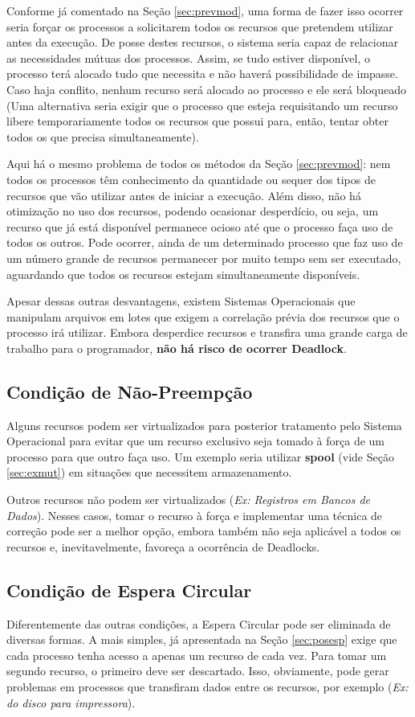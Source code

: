 	Conforme já comentado na Seção \ref{sec:prevmod}, uma forma de fazer isso ocorrer seria forçar os processos a solicitarem todos os recursos que pretendem utilizar antes da execução. De posse destes recursos, o sistema seria capaz de relacionar as necessidades mútuas dos processos. Assim, se tudo estiver disponível, o processo terá alocado tudo que necessita e não haverá possibilidade de impasse. Caso haja conflito, nenhum recurso será alocado ao processo e ele será bloqueado (Uma alternativa seria exigir que o processo que esteja requisitando um recurso libere temporariamente todos os recursos que possui para, então, tentar obter todos os que precisa simultaneamente).

	Aqui há o mesmo problema de todos os métodos da Seção \ref{sec:prevmod}: nem todos os processos têm conhecimento da quantidade ou sequer dos tipos de recursos que vão utilizar antes de iniciar a execução. Além disso, não há otimização no uso dos recursos, podendo ocasionar desperdício, ou seja, um recurso que já está disponível permanece ocioso até que o processo faça uso de todos os outros. Pode ocorrer, ainda de um determinado processo que faz uso de um número grande de recursos permanecer por muito tempo sem ser executado, aguardando que todos os recursos estejam simultaneamente disponíveis.

	Apesar dessas outras desvantagens, existem Sistemas Operacionais que manipulam arquivos em lotes que exigem a correlação prévia dos recursos que o processo irá utilizar. Embora desperdice recursos e transfira uma grande carga de trabalho para o programador, \textbf{não há risco de ocorrer Deadlock}.

	\subsection{Condição de Não-Preempção}
	Alguns recursos podem ser virtualizados para posterior tratamento pelo Sistema Operacional para evitar que um recurso exclusivo seja tomado à força de um processo para que outro faça uso. Um exemplo seria utilizar \textbf{spool} (vide Seção \ref{sec:exmut}) em situações que necessitem armazenamento.

	Outros recursos não podem ser virtualizados (\textit{Ex: Registros em Bancos de Dados}). Nesses casos, tomar o recurso à força e implementar uma técnica de correção pode ser a melhor opção, embora também não seja aplicável a todos os recursos e, inevitavelmente, favoreça a ocorrência de Deadlocks.

	\subsection{Condição de Espera Circular}
	Diferentemente das outras condições, a Espera Circular pode ser eliminada de diversas formas. A mais simples, já apresentada na Seção \ref{sec:posesp} exige que cada processo tenha acesso a apenas um recurso de cada vez. Para tomar um segundo recurso, o primeiro deve ser descartado. Isso, obviamente, pode gerar problemas em processos que transfiram dados entre os recursos, por exemplo (\textit{Ex: do disco para impressora}).

